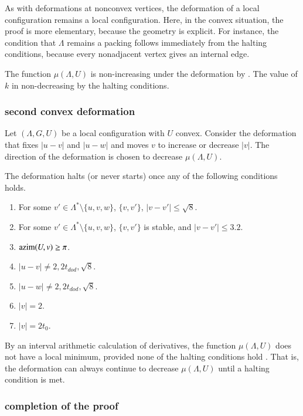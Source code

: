 
As with deformations at nonconvex vertices, 
the deformation of a local
configuration remains a local configuration.  Here, in the
convex situation, the proof is more elementary, because the
geometry is explicit.  For instance, the condition that
$\Lambda$ remains a packing follows immediately from the halting
conditions, because every nonadjacent vertex gives an internal
edge.

The function $\mu(\Lambda,U)$ is non-increasing under the
deformation by \cite[Lemma~\ref{7.8}]{arx}.  The value of
$k$ in non-decreasing by the halting conditions. 

\subsubsection{second convex deformation}

Let $(\Lambda,G,U)$ be a local configuration with $U$ convex.
Consider the deformation that fixes $|u-v|$ and $|u-w|$ and
moves $v$ to increase or decrease $|v|$.  The direction
of the deformation is chosen to decrease $\mu(\Lambda,U)$.


The deformation halts (or never starts) once any
of the following conditions holds.
\begin{enumerate}\label{e:halt-convex}
\item For some $v'\in\Lambda^*\setminus\{u,v,w\}$, 
$\{v,v'\}$, $|v-v'|\le \sqrt8$.
\item For some $v'\in\Lambda^*\setminus\{u,v,w\}$,
$\{v,v'\}$ is  stable, and $|v-v'|\le 3.2$.
\item ${\operatorname{azim}}(U,v)\ge\pi$.
\item $|u-v|\ne 2,2t_{dod},\sqrt8$.
\item $|u-w|\ne 2,2t_{dod},\sqrt8$.
\item $|v|=2$.
\item $|v|=2t_0$.
\end{enumerate}

By an interval arithmetic calculation of derivatives,
the function $\mu(\Lambda,U)$ does not have a local
minimum, provided none of the halting conditions hold
\cite[Lemma~7.10]{arx}.  That is, the deformation can always continue
to decrease $\mu(\Lambda,U)$ until a halting condition is met.



\subsubsection{completion of the proof}


